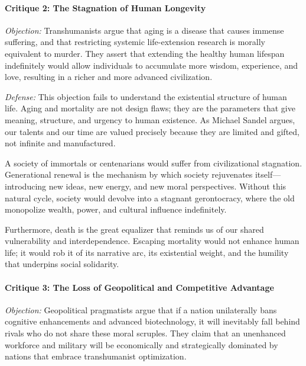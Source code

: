 \paragraph{Critique 2: The Stagnation of Human
Longevity}\label{critique-2-the-stagnation-of-human-longevity}

\emph{Objection:} Transhumanists argue that aging is a disease that
causes immense suffering, and that restricting systemic life-extension
research is morally equivalent to murder. They assert that extending the
healthy human lifespan indefinitely would allow individuals to
accumulate more wisdom, experience, and love, resulting in a richer and
more advanced civilization.

\emph{Defense:} This objection fails to understand the existential
structure of human life. Aging and mortality are not design flaws; they
are the parameters that give meaning, structure, and urgency to human
existence. As Michael Sandel argues, our talents and our time are valued
precisely because they are limited and gifted, not infinite and
manufactured.

A society of immortals or centenarians would suffer from civilizational
stagnation. Generational renewal is the mechanism by which society
rejuvenates itself---introducing new ideas, new energy, and new moral
perspectives. Without this natural cycle, society would devolve into a
stagnant gerontocracy, where the old monopolize wealth, power, and
cultural influence indefinitely.

Furthermore, death is the great equalizer that reminds us of our shared
vulnerability and interdependence. Escaping mortality would not enhance
human life; it would rob it of its narrative arc, its existential
weight, and the humility that underpins social solidarity.

\paragraph{Critique 3: The Loss of Geopolitical and Competitive
Advantage}\label{critique-3-the-loss-of-geopolitical-and-competitive-advantage}

\emph{Objection:} Geopolitical pragmatists argue that if a nation
unilaterally bans cognitive enhancements and advanced biotechnology, it
will inevitably fall behind rivals who do not share these moral
scruples. They claim that an unenhanced workforce and military will be
economically and strategically dominated by nations that embrace
transhumanist optimization.

